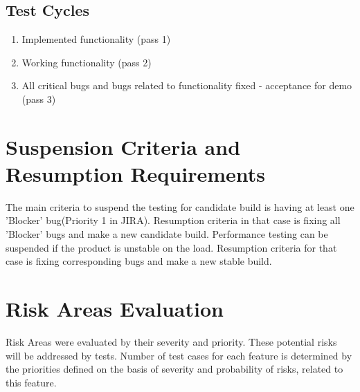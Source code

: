 \documentclass[a4paper,11pt]{article}
\begin{document}
\subsection{Test Cycles}
\begin{enumerate}
\item Implemented functionality (pass 1)
\item Working functionality (pass 2)
\item All critical bugs and bugs related to functionality fixed - acceptance for demo (pass 3)
\end{enumerate}


\section{Suspension Criteria and Resumption Requirements}

The main criteria to suspend the testing for candidate build is having at least one 'Blocker' bug(Priority 1 in JIRA). Resumption criteria in that case is fixing all 'Blocker' bugs and make a new candidate build.
Performance testing can be suspended if the product is unstable on the load. Resumption criteria for that case is fixing corresponding bugs and make a new stable build.


\section{Risk Areas Evaluation}

Risk Areas were evaluated by their severity and priority. These potential risks will be addressed by tests. Number of test cases for each feature is determined by the priorities defined on the basis of severity and probability of risks, related to this feature.
\end{document}
